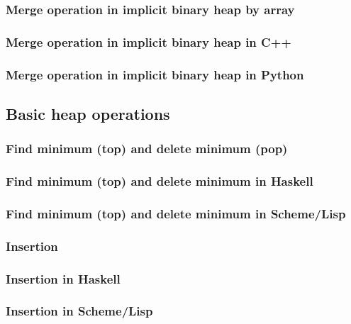 \documentclass{article}
\begin{document}
\subsubsection{Merge operation in implicit binary heap by array}

\subsubsection*{Merge operation in implicit binary heap in C++}

\subsubsection*{Merge operation in implicit binary heap in Python}

\subsection{Basic heap operations}

\subsubsection{Find minimum (top) and delete minimum (pop)}

\subsubsection*{Find minimum (top) and delete minimum in Haskell}

\subsubsection*{Find minimum (top) and delete minimum in Scheme/Lisp}

\subsubsection{Insertion}

\subsubsection*{Insertion in Haskell}

\subsubsection*{Insertion in Scheme/Lisp}
\end{document}
